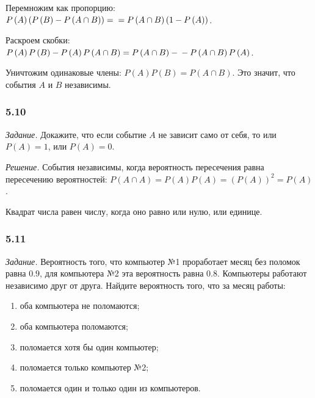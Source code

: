 Перемножим как пропорцию:
$P \left( A \right) \left( P \left( B \right) - P \left( A \cap B \right) \right) = \\
= P \left( A \cap B \right) \left( 1 - P \left( A \right) \right) $.

Раскроем скобки:
$P \left( A \right) P \left( B \right) - P \left( A \right) P \left( A \cap B \right) =
P \left( A \cap B \right) - \\ - P \left( A \cap B \right) P \left( A \right) $.

Уничтожим одинаковые члены: $P \left( A \right) P \left( B \right) = P \left( A \cap B \right) $.
Это значит, что события $A$ и $B$ независимы.

\subsubsection*{5.10}

\textit{Задание.} Докажите, что если событие $A$ не зависит само от себя, то или $P \left( A \right) = 1$, или $P \left( A \right) = 0$.

\textit{Решение.}
События независимы, когда вероятность пересечения равна пересечению вероятностей:
$P \left( A \cap A \right) =
P \left( A \right) P \left( A \right) =
\left( P \left( A \right) \right)^2 =
P \left( A \right) $.

Квадрат числа равен числу, когда оно равно или нулю, или единице.

\subsubsection*{5.11}

\textit{Задание.} Вероятность того, что компьютер №1 проработает месяц без поломок равна $0.9$, для компьютера №2 эта вероятность равна $0.8$.
Компьютеры работают независимо друг от друга.
Найдите вероятность того, что за месяц работы:
\begin{enumerate}[label=\alph*)]
\item оба компьютера не поломаются;
\item оба компьютера поломаются;
\item поломается хотя бы один компьютер;
\item поломается только компьютер №2;
\item поломается один и только один из компьютеров.
\end{enumerate}

